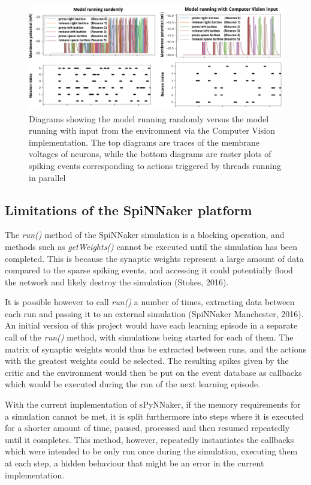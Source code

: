 \documentclass[10pt]{article}
\begin{document}
    \begin{figure}[b]
    \center
    \includegraphics[width=185mm]{./diag12Long.png}
    \caption{Diagrams showing the model running randomly versus the model running with input from the environment via the Computer Vision implementation. The top diagrams are traces of the membrane voltages of neurons, while the bottom diagrams are raster plots of spiking events corresponding to actions triggered by threads running in parallel}
    \label{fig:diag}
    \end{figure}

    \subsection{Limitations of the SpiNNaker platform}

    The \textit{run()} method of the SpiNNaker simulation is a blocking operation, and methods such as \textit{getWeights()} cannot be executed until the simulation has been completed. This is because the synaptic weights represent a large amount of data compared to the sparse spiking events, and accessing it could potentially flood the network and likely destroy the simulation (Stokes, 2016).

    It is possible however to call \textit{run()} a number of times, extracting data between each run and passing it to an external simulation (SpiNNaker Manchester, 2016). An initial version of this project would have each learning episode in a separate call of the \textit{run()} method, with simulations being started for each of them. The matrix of synaptic weights would thus be extracted between runs, and the actions with the greatest weights could be selected. The resulting spikes given by the critic and the environment would then be put on the event database as callbacks which would be executed during the run of the next learning episode.
    
    With the current implementation of sPyNNaker, if the memory requirements for a simulation cannot be met, it is split furthermore into steps where it is executed for a shorter amount of time, paused, processed and then resumed repeatedly until it completes. This method, however, repeatedly instantiates the callbacks which were intended to be only run once during the simulation, executing them at each step, a hidden behaviour that might be an error in the current implementation.
    
\end{document}
